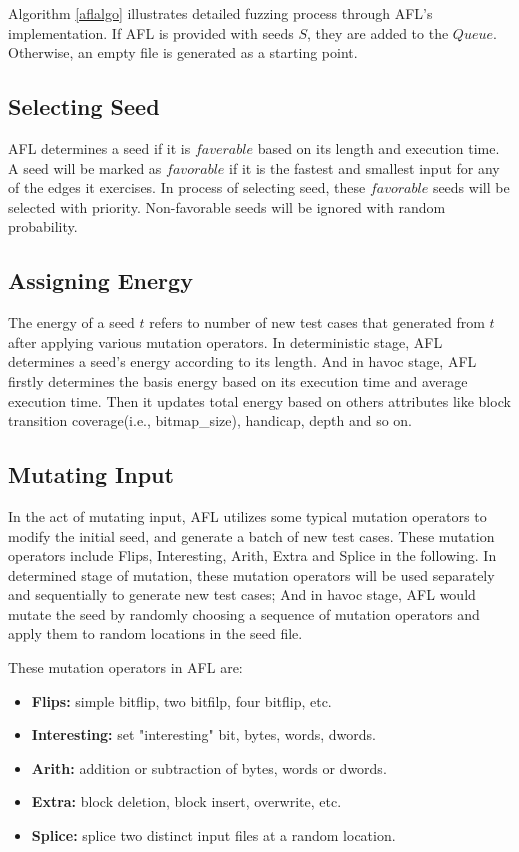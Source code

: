 Algorithm \ref{aflalgo} illustrates detailed fuzzing process through AFL's implementation. If AFL is provided with seeds $S$, they are added to the $Queue$. Otherwise, an empty file is generated as a starting point.

\subsection{Selecting Seed}
AFL determines a seed if it is $faverable$ based on its length and execution time. A seed will be marked as $favorable$ if it is the fastest and smallest input for any of the edges it exercises.  In process of selecting seed, these $favorable$ seeds will be selected with priority. Non-favorable seeds will be ignored with random probability.

\subsection{Assigning Energy}
The energy of a seed $t$ refers to number of new test cases that generated from $t$ after applying various mutation operators. In deterministic stage, AFL determines a seed's energy according to its length. And in havoc stage, AFL firstly determines the basis energy based on its execution time and average execution time. Then it updates total energy based on others attributes like block transition coverage(i.e., bitmap\_size), handicap, depth and so on.  

\subsection{Mutating Input}
In the act of mutating input, AFL utilizes some typical mutation operators to modify the initial seed, and generate a batch of new test cases. These mutation operators include Flips, Interesting, Arith, Extra and Splice in the following. In determined stage of mutation, these mutation operators will be used separately and sequentially to generate new test cases; And in havoc stage, AFL would mutate the seed by randomly choosing a sequence of mutation operators and apply them to random locations in the seed file. 

These mutation operators in AFL  are:
\begin{itemize}
\item  \textbf{Flips:} simple bitflip, two bitfilp, four bitflip, etc. 
\item  \textbf{Interesting:} set "interesting" bit, bytes, words, dwords.
\item  \textbf{Arith:} addition or subtraction of bytes, words or dwords.
\item  \textbf{Extra:} block deletion, block insert, overwrite, etc.
\item  \textbf{Splice:} splice two distinct input files at a random location.
\end{itemize}

